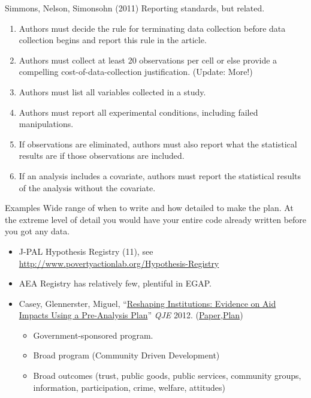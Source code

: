 \documentclass{beamer}
\begin{document}
\begin{frame}{Simmons, Nelson, Simonsohn (2011)}
Reporting standards, but related.
\pause
\begin{enumerate}
\item
  Authors must decide the rule for terminating data collection before
  data collection begins and report this rule in the article.
\item
  Authors must collect at least 20 observations per cell or else provide
  a compelling cost-of-data-collection justification. (Update: More!)
\item
  Authors must list all variables collected in a study.
\item
  Authors must report all experimental conditions, including failed
  manipulations.
\item
  If observations are eliminated, authors must also report what the
  statistical results are if those observations are included.
\item
  If an analysis includes a covariate, authors must report the
  statistical results of the analysis without the covariate.
\end{enumerate}
\end{frame}
\begin{frame}{Examples}
Wide range of when to write and how detailed to make the plan. At the extreme level of detail you would have your entire code already written before you got any data.
\begin{itemize}
\item
J-PAL Hypothesis Registry (11), see \url{http://www.povertyactionlab.org/Hypothesis-Registry}
\item
AEA Registry has relatively few, plentiful in EGAP.
\item
Casey, Glennerster, Miguel, ``\href{http://www.nber.org/data-appendix/w17012/GBF_Supplementary_Appendix_2011-10-07.pdf}{Reshaping Institutions: Evidence on Aid Impacts Using a Pre-Analysis Plan}'' \textit{QJE} 2012. (\href{http://http://eml.berkeley.edu/~emiguel/pdfs/miguel_gbf.pdf}{Paper},\href{http://www.nber.org/data-appendix/w17012/GBF_Supplementary_Appendix_2011-10-07.pdf}{Plan})
\begin{itemize}
 \item Government-sponsored program.
 \item Broad program (Community Driven Development)
 \item Broad outcomes (trust, public goods, public services, community groups, information, participation, crime, welfare, attitudes)
 \end{itemize} 
\end{itemize} 
\end{frame}
\end{document}
